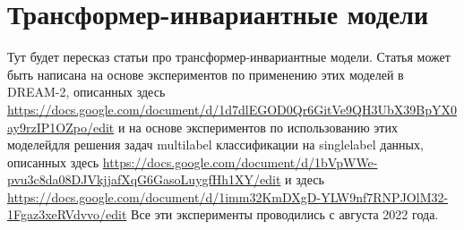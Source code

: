 \chapter{Трансформер-инвариантные модели}\label{ch:ch3}

Тут будет пересказ статьи про трансформер-инвариантные модели. 
Статья может быть написана на основе экспериментов по применению этих моделей в DREAM-2, описанных здесь 
\url{https://docs.google.com/document/d/1d7dlEGOD0Qr6GitVe9QH3UbX39BpYX0ay9rzIP1OZpo/edit}
и на основе экспериментов по использованию этих моделейдля решения задач multilabel классификации на singlelabel данных, описанных здесь
\url{https://docs.google.com/document/d/1bVpWWe-pvu3c8da08DJVkjjafXqG6GasoLuygfHh1XY/edit}
и здесь 
\url{https://docs.google.com/document/d/1imm32KmDXgD-YLW9nf7RNPJOlM32-1Fgaz3xeRVdvvo/edit}
Все эти эксперименты проводились с августа 2022 года.

